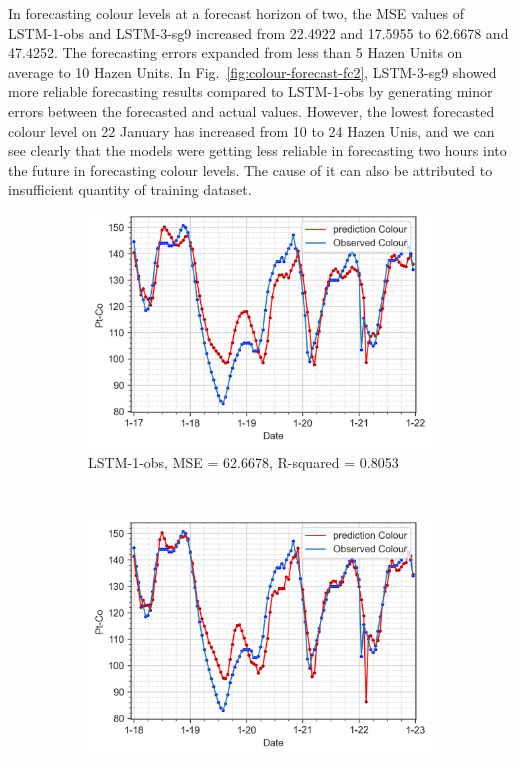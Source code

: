 In forecasting colour levels at a forecast horizon of two, the MSE values of LSTM-1-obs and LSTM-3-sg9 increased from 22.4922 and 17.5955 to 62.6678 and 47.4252. The forecasting errors expanded from less than 5 Hazen Units on average to 10 Hazen Units. In Fig.~\ref{fig:colour-forecast-fc2}, LSTM-3-sg9 showed more reliable forecasting results compared to LSTM-1-obs by generating minor errors between the forecasted and actual values. However, the lowest forecasted colour level on 22 January has increased from 10 to 24 Hazen Unis, and we can see clearly that the models were getting less reliable in forecasting two hours into the future in forecasting colour levels. The cause of it can also be attributed to insufficient quantity of training dataset.

\begin{figure}[!ht]
  \centering
  \begin{subfigure}[t]{0.7\textwidth}
    \includegraphics[width=\linewidth]{imgs/results/steps/colour-lstm-1-fc2.png}
    \caption{LSTM-1-obs, MSE = 62.6678, R-squared = 0.8053} \label{fig:colour-lstm-1-fc2}
  \end{subfigure}\\
  \vspace{1em}
  \begin{subfigure}[t]{0.7\textwidth}
    \includegraphics[width=\linewidth]{imgs/results/steps/colour-lstm-3-fc2.png}

\end{subfigure}
\end{figure}
